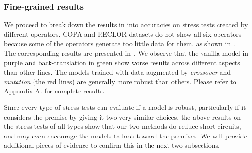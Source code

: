 \subsubsection{Fine-grained results}
\label{sec:fine-grained}
We proceed to break down the results in  into accuracies on stress tests
created by different operators. 
COPA and RECLOR datasets do not show all six operators
because some of the operators generate too little data
for them, as shown in . 
The corresponding results are presented in~. 
We observe that the vanilla model in purple and back-translation in green show
worse results across different aspects than other lines. 
The models trained with data augmented by \textit{crossover} and \textit{mutation} 
(the red lines) are generally more robust than others.
Please refer to Appendix A. 
for complete results. 

Since every type of stress tests 
can evaluate if a model is robust, particularly if it considers the 
premise by giving it two very similar choices, 
the above results on the stress tests of all types show that our two methods do 
reduce short-circuits, and may even encourage the models to look toward the
premises.
We will provide additional pieces of evidence to confirm this in the next two subsections.


